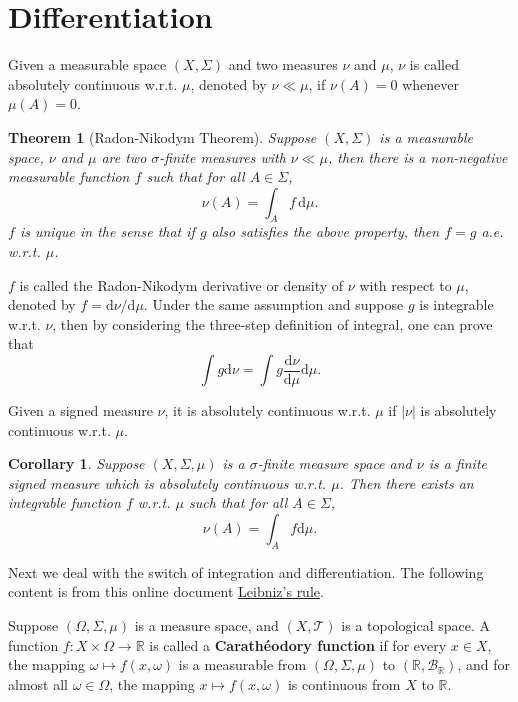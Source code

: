 \documentclass[openany]{book}
\newtheorem{corollary}{Corollary}[chapter]
\newtheorem{theorem}{Theorem}[chapter]
\theoremstyle{definition}
\theoremstyle{remark}
\begin{document}
\section{Differentiation}
Given a measurable space $(X,\Sigma)$ and two measures $\nu$ and $\mu$, $\nu$ is called absolutely continuous w.r.t. $\mu$, denoted by $\nu\ll\mu$, if $\nu(A)=0$ whenever $\mu(A)=0$.
\begin{theorem}[Radon-Nikodym Theorem]
    Suppose $(X,\Sigma)$ is a measurable space, $\nu$ and $\mu$ are two $\sigma$-finite measures with $\nu\ll\mu$, then there is a non-negative measurable function $f$ such that for all $A\in\Sigma$,
    \begin{equation*}
        \nu(A)=\int_Af\,\mathrm{d}\mu.
    \end{equation*}
    $f$ is unique in the sense that if $g$ also satisfies the above property, then $f=g$ a.e. w.r.t. $\mu$.
\end{theorem}
$f$ is called the Radon-Nikodym derivative or density of $\nu$ with respect to $\mu$, denoted by $f=\mathrm{d}\nu/\mathrm{d}\mu$. Under the same assumption and suppose $g$ is integrable w.r.t. $\nu$, then by considering the three-step definition of integral, one can prove that
\begin{equation*}
    \int g \mathrm{d}\nu=\int g \frac{\mathrm{d}\nu}{\mathrm{d}\mu}\mathrm{d}\mu.
\end{equation*}

Given a signed measure $\nu$, it is absolutely continuous w.r.t. $\mu$ if $|\nu|$ is absolutely continuous w.r.t. $\mu$.
\begin{corollary}
    Suppose $(X,\Sigma,\mu)$ is a $\sigma$-finite measure space and $\nu$ is a finite signed measure which is absolutely continuous w.r.t. $\mu$. Then there exists an integrable function $f$ w.r.t. $\mu$ such that for all $A\in\Sigma$,
    \begin{equation*}
        \nu(A)=\int_Af \mathrm{d}\mu.
    \end{equation*}
\end{corollary}

Next we deal with the switch of integration and differentiation. The following content is from this online document \href{http://people.hss.caltech.edu/~kcb/Notes/LeibnizRule.pdf}{Leibniz's rule}.

Suppose $(\Omega,\Sigma,\mu)$ is a measure space, and $(X,\mathcal{T})$ is a topological space. A function $f:X\times\Omega\to \mathbb{R}$ is called a \textbf{Carath\'{e}odory function} if for every $x\in X$, the mapping $\omega\mapsto f(x,\omega)$ is a measurable from $(\Omega,\Sigma,\mu)$ to $(\mathbb{R},\mathcal{B}_{\mathbb{R}})$, and for almost all $\omega\in\Omega$, the mapping $x\mapsto f(x,\omega)$ is continuous from $X$ to $\mathbb{R}$.
\end{document}
